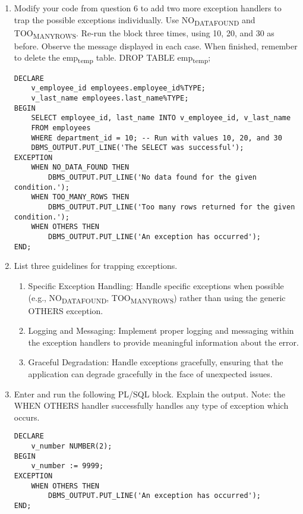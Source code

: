 \documentclass[11pt]{article}
\begin{document}
\begin{enumerate}
\item Modify your code from question 6 to add two more exception handlers to trap the possible exceptions individually. Use NO\textsubscript{DATA}\textsubscript{FOUND} and TOO\textsubscript{MANY}\textsubscript{ROWS}. Re-run the block three times, using 10, 20, and 30 as before. Observe the message displayed in each case. When finished, remember to delete the emp\textsubscript{temp} table. DROP TABLE emp\textsubscript{temp};
\begin{verbatim}
DECLARE
    v_employee_id employees.employee_id%TYPE;
    v_last_name employees.last_name%TYPE;
BEGIN
    SELECT employee_id, last_name INTO v_employee_id, v_last_name
    FROM employees
    WHERE department_id = 10; -- Run with values 10, 20, and 30
    DBMS_OUTPUT.PUT_LINE('The SELECT was successful');
EXCEPTION
    WHEN NO_DATA_FOUND THEN
        DBMS_OUTPUT.PUT_LINE('No data found for the given condition.');
    WHEN TOO_MANY_ROWS THEN
        DBMS_OUTPUT.PUT_LINE('Too many rows returned for the given condition.');
    WHEN OTHERS THEN
        DBMS_OUTPUT.PUT_LINE('An exception has occurred');
END;
\end{verbatim}

\item List three guidelines for trapping exceptions.
\begin{enumerate}
\item Specific Exception Handling: Handle specific exceptions when possible (e.g., NO\textsubscript{DATA}\textsubscript{FOUND}, TOO\textsubscript{MANY}\textsubscript{ROWS}) rather than using the generic OTHERS exception.

\item Logging and Messaging: Implement proper logging and messaging within the exception handlers to provide meaningful information about the error.

\item Graceful Degradation: Handle exceptions gracefully, ensuring that the application can degrade gracefully in the face of unexpected issues.
\end{enumerate}

\item Enter and run the following PL/SQL block. Explain the output. Note: the WHEN OTHERS handler successfully handles any type of exception which occurs.
\begin{verbatim}
DECLARE
    v_number NUMBER(2);
BEGIN
    v_number := 9999;
EXCEPTION
    WHEN OTHERS THEN
        DBMS_OUTPUT.PUT_LINE('An exception has occurred');
END;
\end{verbatim}


\end{enumerate}
\end{document}
